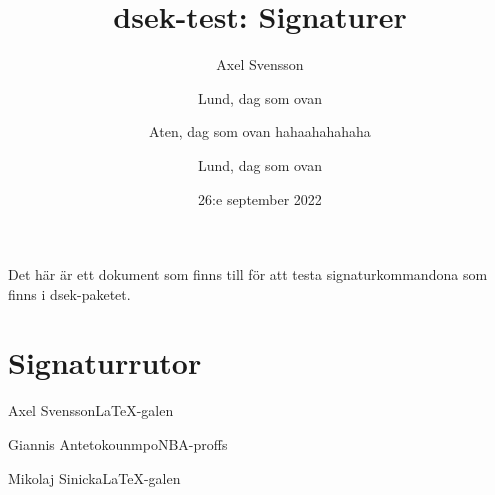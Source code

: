 \documentclass{article}
\title{\textsf{dsek}-test: Signaturer}
\author{Axel Svensson}
\date{26:e september 2022}
\begin{document}
\maketitle

Det här är ett dokument som finns till för att testa signaturkommandona som
finns i \textsf{dsek}-paketet.

\section{Signaturrutor}

\signature{Lund, dag som ovan}{Axel Svensson}{\LaTeX-galen}
\signature{Aten, dag som ovan hahaahahahaha}{Giannis Antetokounmpo}{NBA-proffs}
\signature{Lund, dag som ovan}{Mikolaj Sinicka}{\LaTeX-galen}
\end{document}
